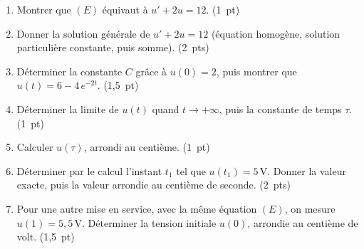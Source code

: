 \documentclass[a4paper,11pt]{article}
\newcommand{\rep}[1]{\par\noindent\begin{minipage}[t][#1cm]{\linewidth}\mbox{}\end{minipage}\par}
\newcommand{\pts}[1]{\unskip\nobreak\hfill\mbox{\small\color{uimmgray}(#1)}}
\begin{document}
\begin{enumerate}
  \needspace{3.6cm}
  \item Montrer que $(E)$ équivaut à $u' + 2u = 12$. \pts{1 pt}
  \rep{2.4}
  \needspace{5.1cm}
  \item Donner la solution générale de $u' + 2u = 12$ (équation homogène, solution particulière constante, puis somme). \pts{2 pts}
  \rep{3.4}
  \needspace{4.6cm}
  \item Déterminer la constante $C$ grâce à $u(0) = 2$, puis montrer que $u(t) = 6 - 4\,e^{-2t}$. \pts{1,5 pt}
  \rep{3.0}
  \needspace{3.6cm}
  \item Déterminer la limite de $u(t)$ quand $t \to +\infty$, puis la constante de temps $\tau$. \pts{1 pt}
  \rep{2.0}
  \needspace{3.6cm}
  \item Calculer $u(\tau)$, arrondi au centième. \pts{1 pt}
  \rep{2.0}
  \needspace{5.6cm}
  \item Déterminer par le calcul l'instant $t_1$ tel que $u(t_1) = 5$\,V. Donner la valeur exacte, puis la valeur arrondie au centième de seconde. \pts{2 pts}
  \rep{4.0}
  \needspace{5.6cm}
  \item Pour une autre mise en service, avec la même équation $(E)$, on mesure $u(1) = 5{,}5$\,V. Déterminer la tension initiale $u(0)$, arrondie au centième de volt. \pts{1,5 pt}
  \rep{4.0}
\end{enumerate}
\end{document}
